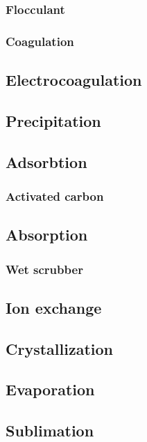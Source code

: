 \documentclass{article}
\begin{document}
\subsubsection{Flocculant}

\subsubsection{Coagulation}

\subsection{Electrocoagulation}

\subsection{Precipitation}

\subsection{Adsorbtion}

\subsubsection{Activated carbon}

\subsection{Absorption}

\subsubsection{Wet scrubber}

\subsection{Ion exchange}

\subsection{Crystallization}

\subsection{Evaporation}

\subsection{Sublimation}
\end{document}

